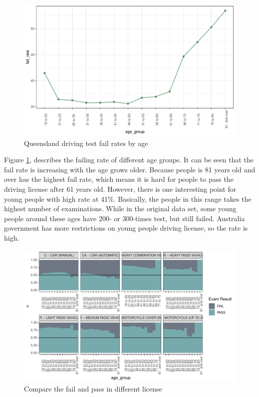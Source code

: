 \documentclass[11pt,a4paper,]{article}
\begin{document}
\begin{figure}

{\centering \includegraphics{Assignment4_files/figure-latex/failrate-1} 

}

\caption{Queensland driving test fail rates by age}\label{fig:failrate}
\end{figure}

Figure \ref{fig:failrate}, describes the failing rate of different age groups. It can be seen that the fail rate is increasing with the age grows older. Because people is 81 years old and over has the highest fail rate, which means it is hard for people to pass the driving license after 61 years old. However, there is one interesting point for young people with high rate at 41\%. Basically, the people in this range takes the highest number of examinations. While in the original data set, some young people around these ages have 200- or 300-times test, but still failed. Australia government has more restrictions on young people driving license, so the rate is high.

\begin{figure}
\centering
\includegraphics{Assignment4_files/figure-latex/license-1.pdf}
\caption{\label{fig:license}Compare the fail and pass in different license}
\end{figure}
\end{document}
